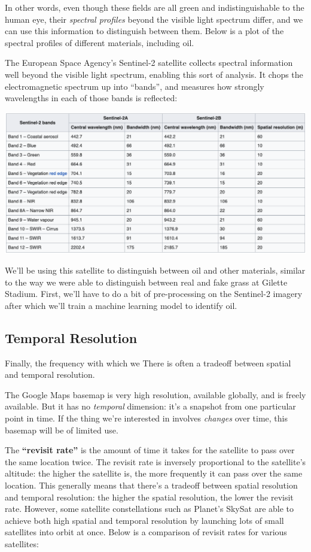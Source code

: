 \documentclass[
  letterpaper,
  DIV=11,
  numbers=noendperiod]{scrreprt}
\begin{document}
In other words, even though these fields are all green and
indistinguishable to the human eye, their \emph{spectral profiles}
beyond the visible light spectrum differ, and we can use this
information to distinguish between them. Below is a plot of the spectral
profiles of different materials, including oil.

The European Space Agency's Sentinel-2 satellite collects spectral
information well beyond the visible light spectrum, enabling this sort
of analysis. It chops the electromagnetic spectrum up into ``bands'',
and measures how strongly wavelengths in each of those bands is
reflected:

\includegraphics{./images/S2_bands.png}

We'll be using this satellite to distinguish between oil and other
materials, similar to the way we were able to distinguish between real
and fake grass at Gilette Stadium. First, we'll have to do a bit of
pre-processing on the Sentinel-2 imagery after which we'll train a
machine learning model to identify oil.

\hypertarget{temporal-resolution}{%
\subsection{Temporal Resolution}\label{temporal-resolution}}

Finally, the frequency with which we There is often a tradeoff between
spatial and temporal resolution.

The Google Maps basemap is very high resolution, available globally, and
is freely available. But it has no \emph{temporal} dimension: it's a
snapshot from one particular point in time. If the thing we're
interested in involves \emph{changes} over time, this basemap will be of
limited use.

The \textbf{``revisit rate''} is the amount of time it takes for the
satellite to pass over the same location twice. The revisit rate is
inversely proportional to the satellite's altitude: the higher the
satellite is, the more frequently it can pass over the same location.
This generally means that there's a tradeoff between spatial resolution
and temporal resolution: the higher the spatial resolution, the lower
the revisit rate. However, some satellite constellations such as
Planet's SkySat are able to achieve both high spatial and temporal
resolution by launching lots of small satellites into orbit at once.
Below is a comparison of revisit rates for various satellites:
\end{document}
